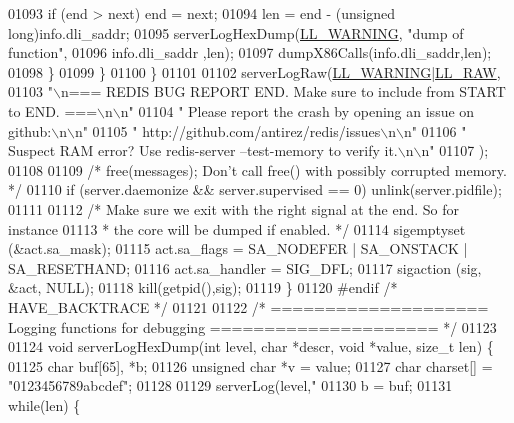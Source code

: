 \begin{DoxyCode}
{{{{{{{{{{{{{{{{{{{{{{{{{{{{{{{{{{{{{{{{{{{{{{{{{{{{{{{{{{{{{{{{{{{{{{{{{01093                 \textcolor{keywordflow}{if} (end > next) end = next;
01094                 len = end - (\textcolor{keywordtype}{unsigned} \textcolor{keywordtype}{long})info.dli\_saddr;
01095                 serverLogHexDump(\hyperlink{server_8h_a31229b9334bba7d6be2a72970967a14b}{LL\_WARNING}, \textcolor{stringliteral}{"dump of function"},
01096                     info.dli\_saddr ,len);
01097                 dumpX86Calls(info.dli\_saddr,len);
01098             \}
01099         \}
01100     \}
01101 
01102     serverLogRaw(\hyperlink{server_8h_a31229b9334bba7d6be2a72970967a14b}{LL\_WARNING}|\hyperlink{server_8h_a6b3768a4d2dfb3ac580b8d999baa9350}{LL\_RAW},
01103 \textcolor{stringliteral}{"\(\backslash\)n=== REDIS BUG REPORT END. Make sure to include from START to END. ===\(\backslash\)n\(\backslash\)n"}
01104 \textcolor{stringliteral}{"       Please report the crash by opening an issue on github:\(\backslash\)n\(\backslash\)n"}
01105 \textcolor{stringliteral}{"           http://github.com/antirez/redis/issues\(\backslash\)n\(\backslash\)n"}
01106 \textcolor{stringliteral}{"  Suspect RAM error? Use redis-server --test-memory to verify it.\(\backslash\)n\(\backslash\)n"}
01107 );
01108 
01109     \textcolor{comment}{/* free(messages); Don't call free() with possibly corrupted memory. */}
01110     \textcolor{keywordflow}{if} (server.daemonize && server.supervised == 0) unlink(server.pidfile);
01111 
01112     \textcolor{comment}{/* Make sure we exit with the right signal at the end. So for instance}
01113 \textcolor{comment}{     * the core will be dumped if enabled. */}
01114     sigemptyset (&act.sa\_mask);
01115     act.sa\_flags = SA\_NODEFER | SA\_ONSTACK | SA\_RESETHAND;
01116     act.sa\_handler = SIG\_DFL;
01117     sigaction (sig, &act, NULL);
01118     kill(getpid(),sig);
01119 \}
01120 \textcolor{preprocessor}{#}\textcolor{preprocessor}{endif} \textcolor{comment}{/* HAVE\_BACKTRACE */}
01121 
01122 \textcolor{comment}{/* ==================== Logging functions for debugging ===================== */}
01123 
01124 \textcolor{keywordtype}{void} serverLogHexDump(\textcolor{keywordtype}{int} level, \textcolor{keywordtype}{char} *descr, \textcolor{keywordtype}{void} *value, size\_t len) \{
01125     \textcolor{keywordtype}{char} buf[65], *b;
01126     \textcolor{keywordtype}{unsigned} \textcolor{keywordtype}{char} *v = value;
01127     \textcolor{keywordtype}{char} charset[] = \textcolor{stringliteral}{"0123456789abcdef"};
01128 
01129     serverLog(level,\textcolor{stringliteral}{"%
01130     b = buf;
01131     \textcolor{keywordflow}{while}(len) \{
}}}}}}}}}}}}}}}}}}}}}}}}}}}}}}}}}}}}}}}}}}}}}}}}}}}}}}}}}}}}}}}}}}}}}}}}}}
\end{DoxyCode}
